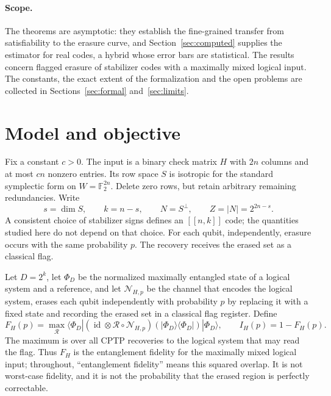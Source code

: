\documentclass[11pt]{article}
\theoremstyle{remark}
\newcommand{\F}{\mathbb F_2}
\begin{document}
\paragraph{Scope.}
The theorems are asymptotic: they establish the fine-grained transfer
from satisfiability to the erasure curve, and
Section~\ref{sec:computed} supplies the estimator for real codes, a
hybrid whose error bars are statistical. The results concern flagged
erasure of stabilizer codes with a maximally mixed logical input. The
constants, the exact extent of the formalization and the open problems
are collected in Sections~\ref{sec:formal} and~\ref{sec:limits}.

\section{Model and objective}
\label{sec:model}

Fix a constant \(c>0\). The input is a binary check matrix \(H\) with
\(2n\) columns and at most \(cn\) nonzero entries. Its row space \(S\) is
isotropic for the standard symplectic form on \(W=\F^{2n}\).
Delete zero rows, but retain arbitrary remaining redundancies. Write
\[
 s=\dim S,\qquad k=n-s,\qquad N=S^\perp,\qquad Z=|N|=2^{2n-s}.
\]
A consistent choice of stabilizer signs defines an \([[n,k]]\) code;
the quantities studied here do not depend on that choice.
For each qubit, independently, erasure occurs with the same probability
\(p\). The recovery receives the erased set as a classical flag.

Let \(D=2^k\), let \(\Phi_D\) be the normalized maximally entangled state
of a logical system and a reference, and let \(\mathcal N_{H,p}\) be the
channel that encodes the logical system, erases each qubit independently
with probability \(p\) by replacing it with a fixed state and recording
the erased set in a classical flag register. Define
\begin{equation}\label{eq:objective}
 F_H(p)=\max_{\mathcal R}
 \langle\Phi_D|(\operatorname{id}\otimes
  \mathcal R\circ\mathcal N_{H,p})(|\Phi_D\rangle\langle\Phi_D|)
 |\Phi_D\rangle,\qquad I_H(p)=1-F_H(p).
\end{equation}
The maximum is over all CPTP recoveries to the logical system that may
read the flag. Thus \(F_H\) is the entanglement fidelity for the
maximally mixed logical input; throughout, ``entanglement fidelity''
means this squared overlap. It is not worst-case fidelity, and it is not
the probability that the erased region is perfectly correctable.
\end{document}
